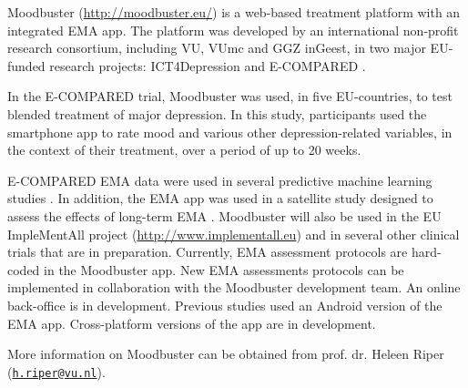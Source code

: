 \documentclass[]{book}
\begin{document}
Moodbuster (\url{http://moodbuster.eu/}) is a web-based treatment
platform with an integrated EMA app. The platform was developed by an
international non-profit research consortium, including VU, VUmc and GGZ
inGeest, in two major EU-funded research projects: ICT4Depression
\citep[see ICT4Depression.eu;][]{warmerdam2012} and E-COMPARED
\citep[see \url{http://e-compared.eu};][]{Kleiboer2016, VandeVen2017}.

In the E-COMPARED trial, Moodbuster was used, in five EU-countries, to
test blended treatment of major depression. In this study, participants
used the smartphone app to rate mood and various other
depression-related variables, in the context of their treatment, over a
period of up to 20 weeks.

E-COMPARED EMA data were used in several predictive machine learning
studies \citep{mikus2018, rocha2018}. In addition, the EMA app was used
in a satellite study designed to assess the effects of long-term EMA
\citep{VanBallegooijen2016}. Moodbuster will also be used in the EU
ImpleMentAll project (\url{http://www.implementall.eu}) and in several
other clinical trials that are in preparation. Currently, EMA assessment
protocols are hard-coded in the Moodbuster app. New EMA assessments
protocols can be implemented in collaboration with the Moodbuster
development team. An online back-office is in development. Previous
studies used an Android version of the EMA app. Cross-platform versions
of the app are in development.

More information on Moodbuster can be obtained from prof. dr. Heleen
Riper (\href{mailto:h.riper@vu.nl}{\nolinkurl{h.riper@vu.nl}}).
\end{document}
